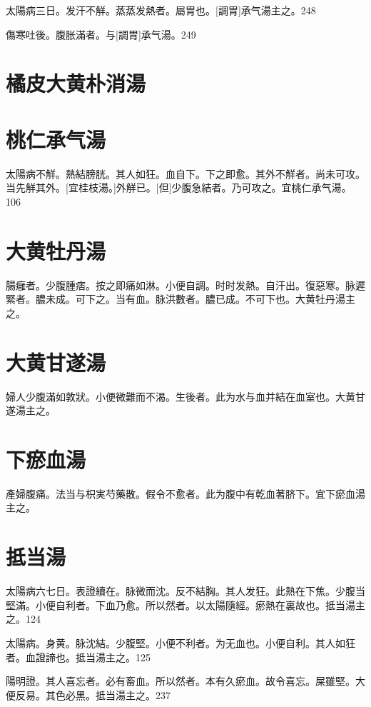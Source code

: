 \documentclass[12pt,twoside,UTF8,b5paper]{ctexbook}
\begin{document}
太陽病三日。发汗不觧。蒸蒸发熱者。屬胃也。[調胃]承气湯主之。248

傷寒吐後。腹胀滿者。与[調胃]承气湯。249

\section{橘皮大黄朴消湯}

\section{桃仁承气湯}

太陽病不觧。熱結膀胱。其人如狂。血自下。下之即愈。其外不觧者。尚未可攻。当先觧其外。[宜桂枝湯。]外觧已。[但]少腹急結者。乃可攻之。宜桃仁承气湯。106

\section{大黄牡丹湯}

腸癰者。少腹腫痞。按之即痛如淋。小便自調。时时发熱。自汗出。復惡寒。脉遲緊者。膿未成。可下之。当有血。脉洪數者。膿已成。不可下也。大黄牡丹湯主之。

\section{大黄甘遂湯}

婦人少腹滿如敦狀。小便微難而不渴。生後者。此为水与血并結在血室也。大黄甘遂湯主之。

\section{下瘀血湯}

產婦腹痛。法当与枳実芍藥散。假令不愈者。此为腹中有乾血著脐下。宜下瘀血湯主之。

\section{抵当湯}

太陽病六七日。表證續在。脉微而沈。反不結胸。其人发狂。此熱在下焦。少腹当堅滿。小便自利者。下血乃愈。所以然者。以太陽隨經。瘀熱在裏故也。抵当湯主之。124

太陽病。身黄。脉沈結。少腹堅。小便不利者。为无血也。小便自利。其人如狂者。血證諦也。抵当湯主之。125

陽明證。其人喜忘者。必有畜血。所以然者。本有久瘀血。故令喜忘。屎雖堅。大便反易。其色必黑。抵当湯主之。237
\end{document}

